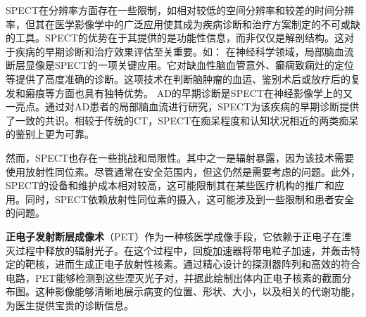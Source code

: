SPECT在分辨率方面存在一些限制，如相对较低的空间分辨率和较差的时间分辨率，但其在医学影像学中的广泛应用使其成为疾病诊断和治疗方案制定的不可或缺的工具。SPECT的优势在于其提供的是功能性信息，而非仅仅是解剖结构。这对于疾病的早期诊断和治疗效果评估至关重要。如：
在神经科学领域，局部脑血流断层显像是SPECT的一项关键应用。它对缺血性脑血管意外、癫痫致痫灶的定位等提供了高度准确的诊断。这项技术在判断脑肿瘤的血运、鉴别术后或放疗后的复发和瘢痕等方面也具有独特优势。
AD的早期诊断是SPECT在神经影像学上的又一亮点。通过对AD患者的局部脑血流进行研究，SPECT为该疾病的早期诊断提供了一致的共识。相较于传统的CT，SPECT在痴呆程度和认知状况相近的两类痴呆的鉴别上更为可靠。

然而，SPECT也存在一些挑战和局限性。其中之一是辐射暴露，因为该技术需要使用放射性同位素。尽管通常在安全范围内，但这仍然是需要考虑的问题。此外，SPECT的设备和维护成本相对较高，这可能限制其在某些医疗机构的推广和应用。同时，SPECT依赖放射性同位素的摄入，这可能涉及到一些限制和患者安全的问题。

    
\textbf{正电子发射断层成像术}（PET）\cite{raichle1983positron}作为一种核医学成像手段，它依赖于正电子在湮灭过程中释放的辐射光子。在这个过程中，回旋加速器将带电粒子加速，并轰击特定的靶核，进而生成正电子放射性核素。通过精心设计的探测器阵列和高效的符合电路，PET能够检测到这些湮灭光子对，并据此绘制出体内正电子核素的截面分布图。这种影像能够清晰地展示病变的位置、形状、大小，以及相关的代谢功能，为医生提供宝贵的诊断信息。

